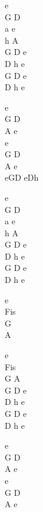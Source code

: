 \begin{chord}
    e\\
    G D\\
    a e\\
    h A\\
    G D e\\
    D h e\\
    G D e\\
    D h e

    e\\
    G D\\
    A e\\
    e\\
    G D\\
    A e\\
    eGD eDh

    e\\
    G D\\
    a e\\
    h A\\
    G D e\\
    D h e\\
    G D e\\
    D h e

    e\\
    Fis\\
    G\\
    A

    e\\
    Fis\\
    G A\\
    G D e\\
    D h e\\
    G D e\\
    D h e

    e\\
    G D\\
    A e\\
    e\\
    G D\\
    A e
\end{chord}
